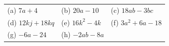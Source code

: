 \begin{enumerate}[noitemsep, label=\textbf{\arabic*}. ]
{    %
        \begin{center}
      \label{m39383*id270628}
    \noindent
      \tablelasttail{}
      \begin{xtabular*}{\mytablewidth}[t]{|p{10\mystarwidth}|p{10\mystarwidth}|p{10\mystarwidth}|}\hline
        (a) $7a+4$ &
        (b) $20a-10$ &
        (c) $18ab-3bc$%
     \tabularnewline{}
        (d) $12kj+18kq$ &
        (e) $16{k}^{2}-4k$ &
        (f) $3{a}^{2}+6a-18$%
     \tabularnewline{}
        (g) $-6a-24$ &
        (h) $-2ab-8a$ &

\end{xtabular*}
\end{center}}
\end{enumerate}
